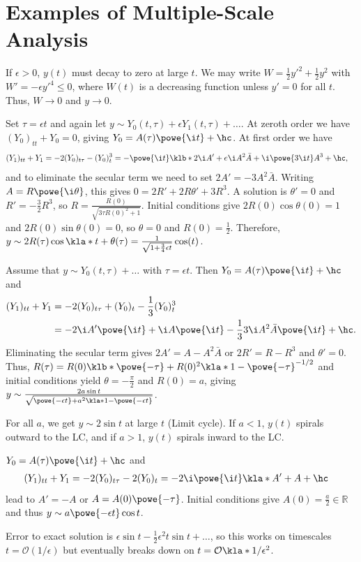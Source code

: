 \documentclass[english, parskip=full]{scrbook}
\newcommand{\note}[1]{\begin{tcolorbox}[colback=colorbackgroundnote,colframe=colornote, breakable,enhanced]#1\end{tcolorbox}}
\newcommand{\example}[3]{\begin{tcolorbox}[colback=colorbackgroundexample,colframe=colorexample, breakable,enhanced,title={\textbf{#1}: #2.}]#3\end{tcolorbox}}
\begin{document}
\section{Examples of Multiple-Scale Analysis}
\example{Damped Oscillator}{$y''+y+\epsilon y'^3=0$, $y(0)=1$, $y'(0)=0$}{
If $\epsilon > 0$, $y(t)$ must decay to zero at large $t$.
We may write $W=\frac{1}{2}y'^2 + \frac{1}{2}y^2$ with $W'=-\epsilon y'^4 \le 0$, where $W(t)$ is a decreasing function unless $y'=0$ for all $t$.
Thus, $W\rightarrow 0$ and $y\rightarrow 0$.

Set $\tau=\epsilon t$ and again let $y\sim Y_0(t,\tau) + \epsilon Y_1(t,\tau) + \dots$.
At zeroth order we have $(Y_0)_{tt} + Y_0= 0$, giving $Y_0=A(\tau) \powe{\i t} + \hc$.
At first order we have
\begin{align}
(Y_1)_{tt} + Y_1 &= -2(Y_0)_{t\tau} - (Y_0)_t^3 = -\powe{\i t} \klb*{2\i A' + e\i A^2\bar{A}} + \i\powe{3\i t}A^3 + \hc,
\end{align}
and to eliminate the secular term we need to set $2A'=-3A^2\bar{A}$.
Writing $A=R\powe{\i \theta}$, this gives $0= 2R' + 2R\theta' + 3R^3$.
A solution is $\theta'=0$ and $R'=-\frac{3}{2}R^3$, so $R=\frac{R(0)}{\sqrt{3\tau R(0)^2+1}}$.
Initial conditions give $2R(0)\cos\theta(0)=1$ and $2R(0)\sin \theta(0)=0$, so $\theta=0$ and $R(0) = \frac{1}{2}$.
Therefore, $y\sim 2R(\tau) \cos\kla*{t + \theta(\tau)} = \frac{1}{\sqrt{1+\frac{3}{4} \epsilon t}} \cos(t)$.
}
\example{A Limit Cycle: Rayleigh Oscillator}{$y''+y=\epsilon \kla*{1 - \frac{1}{3}y'^2}y'$ with $y(0)=0$, $y'(0)=2a$}{
Assume that $y\sim Y_0(t,\tau) + \dots$ with $\tau = \epsilon t$.
Then $Y_0=A(\tau)\powe{\i t} + \hc$ and
\begin{align}
(Y_1)_{tt} + Y_1 &= -2 (Y_0)_{t\tau} + (Y_0)_t - \frac{1}{3} (Y_0)_t^3\\
&= -2\i A'\powe{\i t} + \i A\powe{\i t} - \frac{1}{3} 3\i A^2\bar{A}\powe{\i t} + \hc.
\end{align}
Eliminating the secular term gives $2A'=A - A^2\bar{A}$ or $2R'=R-R^3$ and $\theta'=0$.
Thus, $R(\tau) = R(0)\klb*{\powe{-\tau} + R(0)^2\kla*{1-\powe{-\tau}}}^{-1/2}$ and initial conditions yield $\theta=-\frac{\pi}{2}$ and $R(0)=a$, giving $y\sim \frac{2a\sin t}{\sqrt{\powe{-\epsilon t} + a^2 \kla*{1 - \powe{-\epsilon t}}}}$.
\note{
For all $a$, we get $y\sim 2\sin t$ at large $t$ (Limit cycle).
If $a<1$, $y(t)$ spirals outward to the LC, and if $a>1$, $y(t)$ spirals inward to the LC.
}
}
\example{Damped Harmonic Oscillator}{$y''+2\epsilon y' + y = 0$ with $y(0)=a$ and $y'(0)=0$}{
$Y_0=A(\tau)\powe{\i t} + \hc$ and
\begin{align}
(Y_1)_{tt}+Y_1 &= -2(Y_0)_{t\tau} - 2(Y_0)_t = -2\i \powe{\i t} \kla*{A'+A} + \hc
\end{align}
lead to $A'=-A$ or $A=A(0)\powe{-\tau}$.
Initial conditions give $A(0)=\frac{a}{2}\in\mathbb{R}$ and thus $y\sim a\powe{-\epsilon t} \cos t$.
\note{Error to exact solution is $\epsilon\sin t - \frac{1}{2} \epsilon^2 t\sin t + \dots$, so this works on timescales $t=\mathcal{O}(1/\epsilon)$ but eventually breaks down on $t=\mathcal{O}\kla*{1/\epsilon^2}$.}
}
\end{document}
